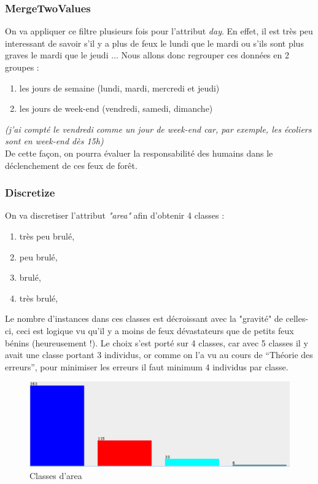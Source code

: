 \documentclass{article}
\begin{document}
\begin{sffamily}
\subsubsection*{MergeTwoValues}

On va appliquer ce filtre plusieurs fois pour l'attribut \textit{day}. En effet, il est très peu interessant de savoir s'il y a 
plus de feux le lundi que le mardi ou s'ils sont plus graves le mardi que le jeudi ... Nous allons donc regrouper ces données en 
2 groupes :
\begin{enumerate}
\item les jours de semaine (lundi, mardi, mercredi et jeudi)
\item les jours de week-end (vendredi, samedi, dimanche)
\end{enumerate}
\textit{(j'ai compté le vendredi comme un jour de week-end car, par exemple, les écoliers sont en week-end dès 15h)} \\

De cette façon, on pourra évaluer la responsabilité des humains dans le déclenchement de ces feux de forêt.

\subsubsection*{Discretize}

On va discretiser l'attribut \textit{"area"} afin d'obtenir 4 classes :
\begin{enumerate}
\item très peu brulé,
\item peu brulé,
\item brulé,
\item très brulé,
\end{enumerate}

Le nombre d'instances dans ces classes est décroissant avec la "gravité" de celles-ci, ceci est logique vu qu'il y a moins de 
feux dévastateurs que de petits feux bénins (heureusement !). Le choix s'est porté sur 4 classes, car avec 5 classes il y avait 
une classe portant 3 individus, or comme on l'a vu au cours de ``Théorie des erreurs'', pour minimiser les erreurs il faut 
minimum 4 individus par classe. \\
 
\begin{figure}[h!]
    \begin{center}
    \includegraphics[scale=0.5]{img_001.pdf}
    \caption{Classes d'area}
    \end{center}	
\end{figure}


\end{sffamily}
\end{document}

